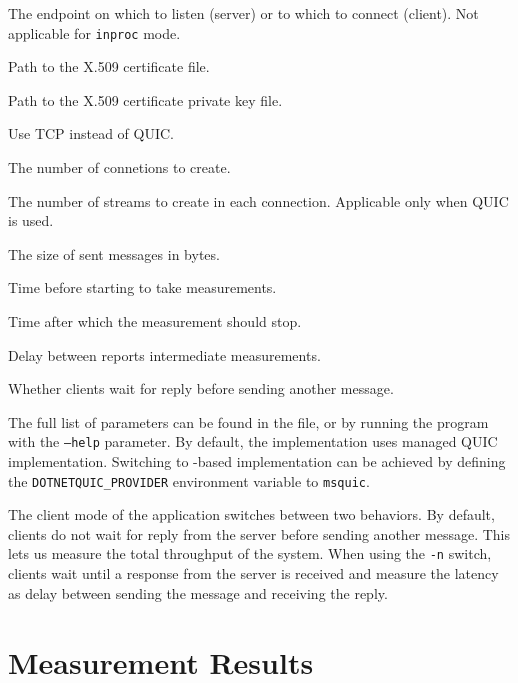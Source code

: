 \begin{description}

     The endpoint on which to listen (server) or to which to connect (client). Not applicable for \texttt{inproc} mode.

     Path to the X.509 certificate file.

     Path to the X.509 certificate private key file.

     Use TCP instead of QUIC\@.

     The number of connetions to create.

     The number of streams to create in each connection. Applicable only when QUIC is used.

     The size of sent messages in bytes.

     Time before starting to take measurements.

     Time after which the measurement should stop.

     Delay between reports intermediate measurements.

     Whether clients wait for reply before sending another message.

\end{description}

The full list of parameters can be found in the  file, or by running the
program with the \texttt{--help} parameter. By default, the implementation uses managed QUIC
implementation. Switching to \libmsquic{}-based implementation can be achieved by defining the
\texttt{DOTNETQUIC_PROVIDER} environment variable to \texttt{msquic}.

The client mode of the application switches between two behaviors. By default, clients do not wait
for reply from the server before sending another message. This lets us measure the total throughput
of the system. When using the \texttt{-n} switch, clients wait until a response from the server is
received and measure the latency as delay between sending the message and receiving the reply.

\section{Measurement Results}\label{sec:04-perf-results}


